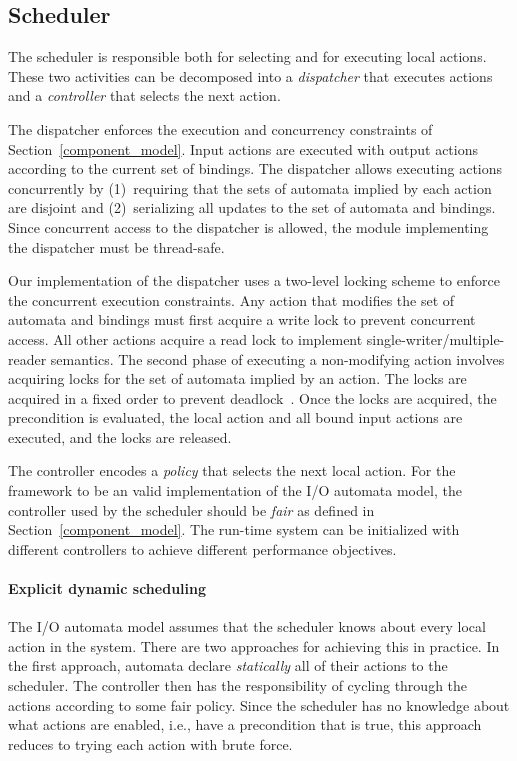 \subsection{Scheduler\label{scheduling}}

The scheduler is responsible both for selecting and for executing local actions.
These two activities can be decomposed into a \emph{dispatcher} that executes actions and a \emph{controller} that selects the next action.

The dispatcher enforces the execution and concurrency constraints of Section~\ref{component_model}.
Input actions are executed with output actions according to the current set of bindings.
The dispatcher allows executing actions concurrently by (1)~requiring that the sets of automata implied by each action are disjoint and (2)~serializing all updates to the set of automata and bindings.
Since concurrent access to the dispatcher is allowed, the module implementing the dispatcher must be thread-safe.

Our implementation of the dispatcher uses a two-level locking scheme to enforce the concurrent execution constraints.
Any action that modifies the set of automata and bindings must first acquire a write lock to prevent concurrent access.
All other actions acquire a read lock to implement single-writer/multiple-reader semantics.
The second phase of executing a non-modifying action involves acquiring locks for the set of automata implied by an action.
The locks are acquired in a fixed order to prevent deadlock~\cite{havender1968avoiding}.
Once the locks are acquired, the precondition is evaluated, the local action and all bound input actions are executed, and the locks are released.

The controller encodes a \emph{policy} that selects the next local action.
For the framework to be an valid implementation of the I/O automata model, the controller used by the scheduler should be \emph{fair} as defined in Section~\ref{component_model}.
The run-time system can be initialized with different controllers to achieve different performance objectives.

\paragraph*{Explicit dynamic scheduling}
The I/O automata model assumes that the scheduler knows about every local action in the system.
There are two approaches for achieving this in practice.
In the first approach, automata declare \emph{statically} all of their actions to the scheduler.
The controller then has the responsibility of cycling through the actions according to some fair policy.
Since the scheduler has no knowledge about what actions are enabled, i.e., have a precondition that is true, this approach reduces to trying each action with brute force.

